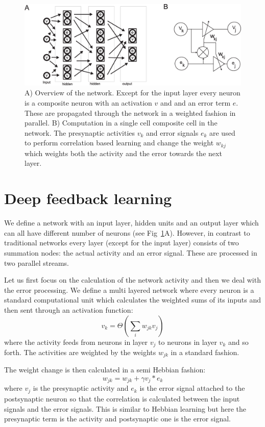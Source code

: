 \documentclass{llncs}
\begin{document}
\begin{figure}[h!]
  \centering
  \includegraphics[width=\columnwidth]{netw_together}
  \caption{A) Overview of the network. Except for the input layer
    every neuron is a composite neuron with an activation $v$ and
    and an error term $e$. These are propagated through the network
    in a weighted fashion in parallel.
B) Computation in a single cell composite cell in the network.
    The presynaptic activities $v_k$ and error signals $e_k$ are used
    to perform correlation based learning and change the weight $w_{kj}$
    which weights both the activity and the error towards the next
    layer.\label{netw_together}}
\end{figure}


\section{Deep feedback learning}
We define a network with an input layer, hidden units and an output
layer which can all have different number of neurons (see
Fig~\ref{netw_together}A). However, in contrast to traditional
networks every layer (except for the input layer) consists of two
summation nodes: the actual activity and an error signal. These
are processed in two parallel streams.

Let us first focus on the calculation of the network activity and then
we deal with the error processing. We define a multi layered network
where every neuron is a standard computational unit which calculates
the weighted sums of its inputs and then sent through an activation
function:
\begin{equation}
  v_k = \Theta\left( \sum_i w_{jk} v_{j} \right) \label{act_sum}
\end{equation}
where the activity feeds from neurons in layer $v_j$ to neurons in layer $v_k$
and so forth. The activities are weighted by the weights $w_{jk}$
in a standard fashion.

The weight change is then calculated in a semi Hebbian fashion:
\begin{equation}
  w_{jk} = w_{jk} + \gamma v_j * e_k
\end{equation}
where $v_j$ is the presynaptic activity and $e_k$ is the error signal
attached to the postsynaptic neuron so that the correlation is
calculated between the input signals and the error signals. This is similar
to Hebbian learning but here the presynaptic term is the activity
and postsynaptic one is the error signal.
\end{document}
